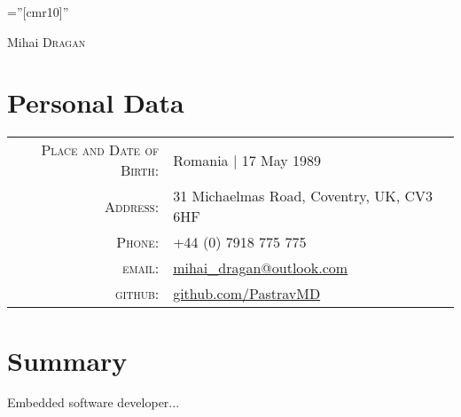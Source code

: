 \documentclass[a4paper,10pt]{article}
\begin{document}
\pagestyle{empty} %

\font\fb=''[cmr10]'' %

\par{\centering
		{\Huge Mihai \textsc{Dragan}
	}\bigskip\par}

\section{Personal Data}

\begin{tabular}{rl}
    \textsc{Place and Date of Birth:} & Romania  | 17 May 1989 \\
    \textsc{Address:}   & 31 Michaelmas Road, Coventry, UK, CV3 6HF \\
    \textsc{Phone:}     & +44 (0) 7918 775 775\\
    \textsc{email:}     & \href{mailto:mihai_dragan@outlook.com}{mihai\_dragan@outlook.com}\\
    \textsc{github:}    & \href{https://github.com/PastravMD}{github.com/PastravMD}
\end{tabular}

\section{Summary}
Embedded software developer...

\end{document}
